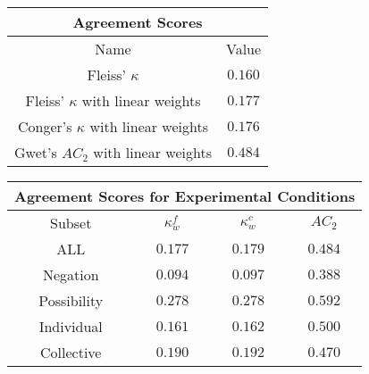 
\begin{minipage}{\linewidth}\begin{tabular}{|c|c|}
\hline
\multicolumn{2}{|c|}{Agreement Scores}\\\hline
Name & Value \\\hline
Fleiss' $\kappa$ & $0.160$\\\hline
Fleiss' $\kappa$ with linear weights & $0.177$\\\hline
Conger's $\kappa$ with linear weights & $0.176$\\\hline
Gwet's $AC_2$ with linear weights & $0.484$\\\hline
\end{tabular}
\end{minipage}
\newline
\newline
\newline
\begin{minipage}{\linewidth}
\begin{tabular}{|c|c|c|c|}
\hline
\multicolumn{4}{|c|}{Agreement Scores for Experimental Conditions}\\\hline
Subset &  $\kappa^{f}_{w}$ & $\kappa^{c}_{w}$ & $AC_2$\\\hline
ALL & $0.177$ & $0.179$ & $0.484$\\\hline
Negation & $0.094$ & $0.097$ & $0.388$\\\hline
Possibility & $0.278$ & $0.278$ & $0.592$\\\hline
Individual & $0.161$ & $0.162$ & $0.500$\\\hline
Collective & $0.190$ & $0.192$ & $0.470$\\\hline
\end{tabular}
\end{minipage}
\newline
\newline
\newline
